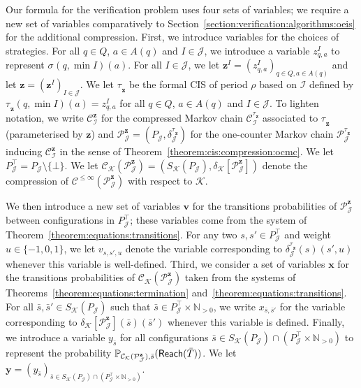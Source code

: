 \documentclass[a4paper,UKenglish,cleveref,autoref,thm-restate,colorlinks]{lipics-v2021}
\newcommand{\IN}{\mathbb{N}}
\newcommand{\INpos}{\IN_{>0}}
\newcommand{\mdpStateSpace}{S}
\newcommand{\weightVal}{u}
\newcommand{\ocStateSpace}{Q}
\newcommand{\ocState}{q}
\newcommand{\ocConfig}{s}
\newcommand{\ocActionSpace}{A}
\newcommand{\ocAction}{a}
\newcommand{\ocTrans}{\delta}
\newcommand{\period}{\rho}
\newcommand{\mchain}{\mathcal{C}}
\newcommand{\ocChain}{\mathcal{P}}
\newcommand{\ocChainFin}[2]{\mchain^{\leq #2}(#1)}
\newcommand{\intPart}{\mathcal{I}}
\newcommand{\intPartB}{\mathcal{J}}
\newcommand{\intPartC}{\mathcal{K}}
\newcommand{\interval}{I}
\newcommand{\compressChainStrat}[1]{\mchain^{#1}_{\intPart}}
\newcommand{\cisChainStrat}[1]{\ocChain^{#1}_{\intPartB}}
\newcommand{\cisChainStateSpace}{P_{\intPartB}}
\newcommand{\cisChainStateSpaceStar}{P_{\intPartB}^{\top}}
\newcommand{\cisChainTransTemplate}[2]{\ocTrans_{#1}^{#2}}
\newcommand{\compressCisStateSpace}{\mdpStateSpace_{\intPartC}({\cisChainStateSpace})}
\newcommand{\cisConfig}{\bar{\ocConfig}}
\newcommand{\varTrans}{x}
\newcommand{\varTransTuple}{\mathbf{\varTrans}}
\newcommand{\varObj}{y}
\newcommand{\varObjTuple}{\mathbf{\varObj}}
\newcommand{\varStrat}{z}
\newcommand{\varStratI}{\mathbf{\varStrat}^{\interval}}
\newcommand{\varStratTuple}{\mathbf{\varStrat}}
\newcommand{\varCis}{v}
\newcommand{\varCisTuple}{\mathbf{\varCis}}
\newcommand{\compressChainSymbolicVerbose}{\compressChainStrat{\stratB_{\varStratTuple}}}
\newcommand{\compressChainSymbolic}{\compressChainStrat{\varStratTuple}}
\newcommand{\cisChainSymbolic}{\cisChainStrat{\varStratTuple}}
\newcommand{\cisChainSymbolicVerbose}{\cisChainStrat{\stratB_{\varStratTuple}}}
\newcommand{\cisChainTransSymbolic}{\cisChainTransTemplate{\intPartB}{\stratB_{\varStratTuple}}}
\newcommand{\cisChainTupleSymbolic}{(\cisChainStateSpace, \cisChainTransSymbolic)}
\newcommand{\compressCisSymbolic}{\mchain_{\intPartC}({\cisChainSymbolic})}
\newcommand{\compressCisTransSymbolic}{\ocTrans_{\intPartC}[{\cisChainSymbolic}]}
\newcommand{\compressCisTupleSymbolic}{(\compressCisStateSpace, \compressCisTransSymbolic)}
\newcommand{\reach}[1]{\mathsf{Reach}(#1)}
\newcommand{\target}{T}
\newcommand{\stratGeneric}[1]{{\sigma_{#1}}}
\newcommand{\strat}{\stratGeneric{}}
\newcommand{\stratBGeneric}[1]{{\tau_{#1}}}
\newcommand{\stratB}{\stratBGeneric{}}
\begin{document}
Our formula for the verification problem uses four sets of variables; we require a new set of variables comparatively to Section~\ref{section:verification:algorithms:oeis} for the additional compression.
First, we introduce variables for the choices of strategies.
For all $\ocState\in\ocStateSpace$, $\ocAction\in\ocActionSpace(\ocState)$ and $\interval\in\intPartB$, we introduce a variable $\varStrat_{\ocState, \ocAction}^\interval$ to represent $\strat(\ocState,\min\interval)(\ocAction)$.
For all $\interval\in\intPartB$, we let $\varStratI = (\varStrat^\interval_{\ocState, \ocAction})_{\ocState\in\ocStateSpace, \ocAction\in\ocActionSpace(\ocState)}$ and let $\varStratTuple=(\varStratI)_{\interval\in\intPartB}$.
We let $\stratB_{\varStratTuple}$ be the formal CIS of period $\period$ based on $\intPart$ defined by $\stratB_{\varStratTuple}(\ocState, \min\interval)(\ocAction) = \varStrat^\interval_{\ocState, \ocAction}$ for all $\ocState\in\ocStateSpace$, $\ocAction\in\ocActionSpace(\ocState)$ and $\interval\in\intPartB$.
To lighten notation, we write $\compressChainSymbolic$ for the compressed Markov chain $\compressChainSymbolicVerbose$ associated to $\stratB_{\varStratTuple}$ (parameterised by $\varStratTuple$) and $\cisChainSymbolic=\cisChainTupleSymbolic$ for the one-counter Markov chain $\cisChainSymbolicVerbose$ inducing $\compressChainSymbolic$ in the sense of Theorem~\ref{theorem:cis:compression:ocmc}.
We let $\cisChainStateSpaceStar = \cisChainStateSpace\setminus\{\bot\}$.
We let $\compressCisSymbolic = \compressCisTupleSymbolic$ denote the compression of $\ocChainFin{\cisChainSymbolic}{\infty}$ with respect to $\intPartC$.

We then introduce a new set of variables $\varCisTuple$ for the transitions probabilities of $\cisChainSymbolic$ between configurations in $\cisChainStateSpaceStar$; these variables come from the system of Theorem~\ref{theorem:equations:transitions}.
For any two $\ocConfig, \ocConfig'\in\cisChainStateSpaceStar$ and weight $\weightVal\in\{-1, 0, 1\}$, we let $\varCis_{\ocConfig, \ocConfig',\weightVal}$ denote the variable corresponding to $\cisChainTransSymbolic(\ocConfig)(\ocConfig', \weightVal)$ whenever this variable is well-defined.
Third, we consider a set of variables $\varTransTuple$ for the transitions probabilities of $\compressCisSymbolic$ taken from the systems of Theorems~\ref{theorem:equations:termination} and~\ref{theorem:equations:transitions}.
For all $\cisConfig, \cisConfig'\in\compressCisStateSpace$ such that $\cisConfig\in\cisChainStateSpaceStar\times\INpos$, we write $\varTrans_{\cisConfig, \cisConfig'}$ for the variable corresponding to $\compressCisTransSymbolic(\cisConfig)(\cisConfig')$ whenever this variable is defined.
Finally, we introduce a variable $\varObj_{\cisConfig}$ for all configurations $\cisConfig\in\compressCisStateSpace\cap(\cisChainStateSpaceStar\times\INpos)$ to represent the probability $\probaMCverb{\compressCisSymbolic}{\cisConfig}(\reach{\bar{\target}})$.
We let $\varObjTuple=(\varObj_{\cisConfig})_{\cisConfig\in\compressCisStateSpace\cap(\cisChainStateSpaceStar\times\INpos)}$.
\end{document}
